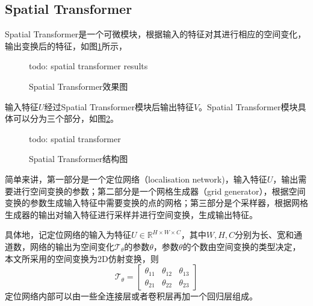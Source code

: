 \subsection{Spatial Transformer}
Spatial Transformer是一个可微模块，根据输入的特征对其进行相应的空间变化，输出变换后的特征，如图\ref{fig:spatial_transformer_results}所示，
\begin{figure}
  \centering
  todo: spatial transformer results
  \caption{Spatial Transformer效果图}
  \label{fig:spatial_transformer_results}
\end{figure}
输入特征$U$经过Spatial Transformer模块后输出特征$V$。Spatial Transformer模块具体可以分为三个部分，如图\ref{fig:spatial_transformer}。
\begin{figure}
  \centering
  todo: spatial transformer
  \caption{Spatial Transformer结构图}
  \label{fig:spatial_transformer}
\end{figure}
简单来讲，第一部分是一个定位网络（localisation network)，输入特征$U$，输出需要进行空间变换的参数；第二部分是一个网格生成器（grid generator），根据空间变换的参数生成输入特征中需要变换的点的网格；第三部分是个采样器，根据网格生成器的输出对输入特征进行采样并进行空间变换，生成输出特征。

具体地，记定位网络的输入为特征$U\in \mathbb{R}^{H\times W\times C}$，其中$W,H,C$分别为长、宽和通道数，网络的输出为空间变化$\mathcal{T}_{\theta}$的参数$\theta$，参数$\theta$的个数由空间变换的类型决定，本文所采用的空间变换为2D仿射变换，则
\begin{equation}
  \mathcal{T}_\theta = \left[
    \begin{array}{ccc}
      \theta_{11}&\theta_{12}&\theta_{13}\\
      \theta_{21}&\theta_{22}&\theta_{23}
    \end{array}
    \right]
\end{equation}
定位网络内部可以由一些全连接层或者卷积层再加一个回归层组成。

